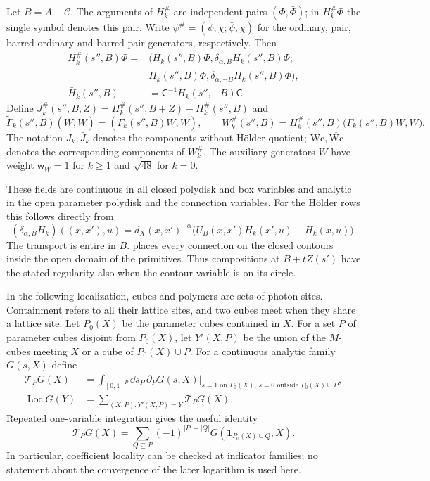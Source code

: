 Let $B=A+\mathscr C$.
The arguments of $H_k^\#$ are independent pairs
$(\Phi,\bar\Phi)$; in $H_k^\#\Phi$ the single symbol denotes
this pair. Write
$\psi^\#=(\psi,\chi;\bar\psi,\bar\chi)$ for the ordinary,
pair, barred ordinary and barred pair generators, respectively.
Then
\[
 \begin{aligned}
 H_k^\#(s'',B)\Phi
   ={}&(H_k(s'',B)\Phi,\delta_{\alpha,B}H_k(s'',B)\Phi;\\
       &
       \bar H_k(s'',B)\bar\Phi,
                       \delta_{\alpha,-B}\bar H_k(s'',B)\bar\Phi),\\
 \bar H_k(s'',B)&=\mathsf C^{-1}H_k(s'',-B)\mathsf C.
 \end{aligned}
\]
Define
$J_k^\#(s'',B,Z)=H_k^\#(s'',B+Z)-H_k^\#(s'',B)$ and
\[
 \widetilde\Gamma_k(s'',B)(W,\bar W)
                         =(\Gamma_k(s'',B)W,\bar W),\qquad
 W_k^\#(s'',B)=H_k^\#(s'',B)
                         \big(\Gamma_k(s'',B)W,\bar W\big).
\]
The notation $J_k,\bar J_k$ denotes the components without
H\"older quotient; $\mathrm{Wc},\overline{\mathrm{Wc}}$ denotes
the corresponding components of $W_k^\#$.
The auxiliary generators $W$ have weight
$\mathsf w_W=1$ for $k\ge1$ and $\sqrt{48}$ for $k=0$.

These fields are continuous in all closed polydisk and box
variables and analytic in the open parameter polydisk and the
connection variables. For the H\"older rows this follows
directly from
\[
 (\delta_{\alpha,B}H_k)((x,x'),u)
   =d_X(x,x')^{-\alpha}
       \big(U_B(x,x')H_k(x',u)-H_k(x,u)\big).
\]
The transport is entire in $B$. 
places every connection on the closed contours inside the
open domain of the primitives. Thus compositions at
$B+tZ(s')$ have the stated regularity also when the contour
variable is on its circle.

In the following localization, cubes and polymers are sets
of photon sites. Containment refers to all their lattice sites,
and two cubes meet when they share a lattice site.
Let $P_0(X)$ be the parameter cubes contained in $X$.
For a set $P$ of parameter cubes disjoint from $P_0(X)$, let $Y'(X,P)$ be the union of
the $M$-cubes meeting $X$ or a cube of $P_0(X)\cup P$.
For a continuous analytic family $G(s,X)$ define
\begin{align}
 \mathcal T_PG(X)
  &=\int_{[0,1]^P}\dd s_P\,
       \partial_PG(s,X)
       \big|_{s=1\text{ on }P_0(X),\,
                    s=0\text{ outside }P_0(X)\cup P},
                          \label{eq:rgnl-interpolation}\\
 \operatorname{Loc}G(Y)
  &=\sum_{(X,P):Y'(X,P)=Y}\mathcal T_PG(X).
                          \label{eq:rgnl-localization}
\end{align}
Repeated one-variable integration gives the useful identity
\begin{equation}\label{eq:rgnl-finite-difference}
 \mathcal T_PG(X)=
    \sum_{Q\subseteq P}(-1)^{|P|-|Q|}
                                 G(\mathbf1_{P_0(X)\cup Q},X).
\end{equation}
In particular, coefficient locality can be checked at
indicator families; no statement about the convergence of
the later logarithm is used here.

